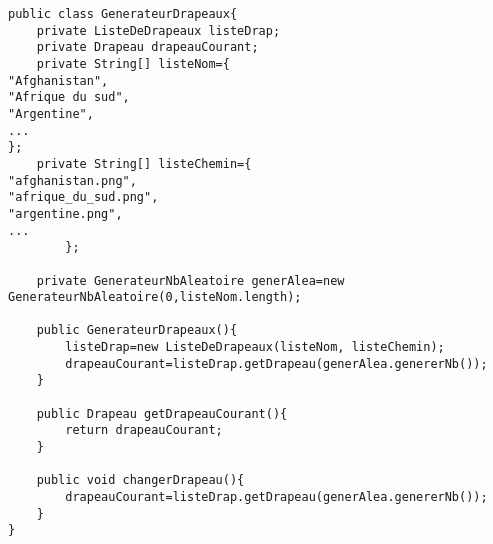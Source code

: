 \begin{verbatim}
public class GenerateurDrapeaux{
	private ListeDeDrapeaux listeDrap;
	private Drapeau drapeauCourant;
	private String[] listeNom={
"Afghanistan",
"Afrique du sud",
"Argentine",
...
};
	private String[] listeChemin={
"afghanistan.png",
"afrique_du_sud.png",
"argentine.png",
...
        };

	private GenerateurNbAleatoire generAlea=new GenerateurNbAleatoire(0,listeNom.length);

	public GenerateurDrapeaux(){
		listeDrap=new ListeDeDrapeaux(listeNom, listeChemin);
		drapeauCourant=listeDrap.getDrapeau(generAlea.genererNb());
	}

	public Drapeau getDrapeauCourant(){
		return drapeauCourant;
	}

	public void changerDrapeau(){
		drapeauCourant=listeDrap.getDrapeau(generAlea.genererNb());
	}
}
\end{verbatim}
